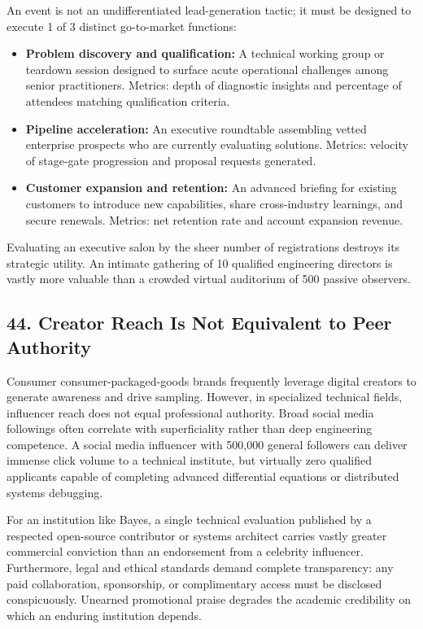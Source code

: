 An event is not an undifferentiated lead-generation tactic; it must be designed to execute 1 of 3 distinct go-to-market functions:
\begin{itemize}[leftmargin=*,itemsep=1pt]
  \item \textbf{Problem discovery and qualification:} A technical working group or teardown session designed to surface acute operational challenges among senior practitioners. Metrics: depth of diagnostic insights and percentage of attendees matching qualification criteria.
  \item \textbf{Pipeline acceleration:} An executive roundtable assembling vetted enterprise prospects who are currently evaluating solutions. Metrics: velocity of stage-gate progression and proposal requests generated.
  \item \textbf{Customer expansion and retention:} An advanced briefing for existing customers to introduce new capabilities, share cross-industry learnings, and secure renewals. Metrics: net retention rate and account expansion revenue.
\end{itemize}

Evaluating an executive salon by the sheer number of registrations destroys its strategic utility. An intimate gathering of 10 qualified engineering directors is vastly more valuable than a crowded virtual auditorium of 500 passive observers.

\subsection*{44. Creator Reach Is Not Equivalent to Peer Authority}

Consumer consumer-packaged-goods brands frequently leverage digital creators to generate awareness and drive sampling. However, in specialized technical fields, influencer reach does not equal professional authority. Broad social media followings often correlate with superficiality rather than deep engineering competence. A social media influencer with 500,000 general followers can deliver immense click volume to a technical institute, but virtually zero qualified applicants capable of completing advanced differential equations or distributed systems debugging.

For an institution like Bayes, a single technical evaluation published by a respected open-source contributor or systems architect carries vastly greater commercial conviction than an endorsement from a celebrity influencer. Furthermore, legal and ethical standards demand complete transparency: any paid collaboration, sponsorship, or complimentary access must be disclosed conspicuously. Unearned promotional praise degrades the academic credibility on which an enduring institution depends.

